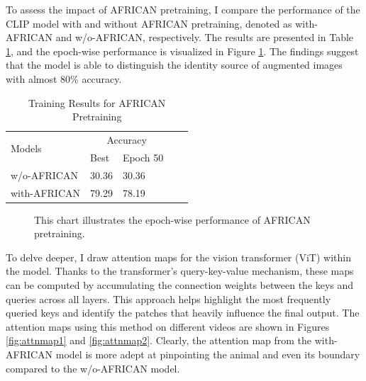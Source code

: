 To assess the impact of AFRICAN pretraining, I compare the performance of the CLIP model with and without AFRICAN pretraining, denoted as with-AFRICAN and w/o-AFRICAN, respectively. The results are presented in Table \ref{tab:africanpretrainingresults}, and the epoch-wise performance is visualized in Figure \ref{fig:tp_africanpretraining}. The findings suggest that the model is able to distinguish the identity source of augmented images with almost 80\% accuracy. 

\begin{table}[ht]
    \centering
    \caption{Training Results for AFRICAN Pretraining}
    \label{tab:africanpretrainingresults}
    \begin{tabular}{lllll}
        \toprule
        \multirow{2}{*}{Models} & \multicolumn{2}{c}{Accuracy} \\
        \cmidrule{2-3} 
        {} &  Best & Epoch 50\\
        \midrule
        w/o-AFRICAN   & 30.36 & 30.36 \\
        with-AFRICAN  & 79.29 & 78.19 \\
        \bottomrule
    \end{tabular}
\end{table}

\begin{figure}[ht]
    \centering
    \resizebox{1.0\textwidth}{!}{}
    \caption[Accuracy of AFRICAN Pretraining on each epoch]{This chart illustrates the epoch-wise performance of AFRICAN pretraining.}
    \label{fig:tp_africanpretraining}
\end{figure}

To delve deeper, I draw attention maps for the vision transformer (ViT) within the model. Thanks to the transformer's query-key-value mechanism, these maps can be computed by accumulating the connection weights between the keys and queries across all layers. This approach helps highlight the most frequently queried keys and identify the patches that heavily influence the final output. The attention maps using this method on different videos are shown in Figures \ref{fig:attnmap1} and \ref{fig:attnmap2}. Clearly, the attention map from the with-AFRICAN model is more adept at pinpointing the animal and even its boundary compared to the w/o-AFRICAN model.

